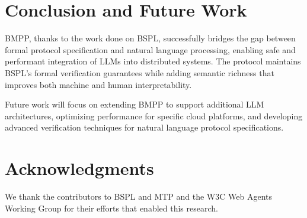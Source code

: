 \documentclass[11pt,a4paper]{article}
\begin{document}
	
	\section{Conclusion and Future Work}
	\label{sec:conclusion}
	
	BMPP, thanks to the work done on BSPL, successfully bridges the gap between formal protocol specification and natural language processing, enabling safe and performant integration of LLMs into distributed systems. The protocol maintains BSPL's formal verification guarantees while adding semantic richness that improves both machine and human interpretability.
	
	Future work will focus on extending BMPP to support additional LLM architectures, optimizing performance for specific cloud platforms, and developing advanced verification techniques for natural language protocol specifications.
	
	\section*{Acknowledgments}
	
	We thank the contributors to BSPL and MTP and the W3C Web Agents Working Group for their efforts that enabled this research.
	
\end{document}
